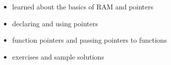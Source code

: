 \documentclass[11pt]{article}
\makeatletter
\providecommand{\tightlist}{%
      \setlength{\itemsep}{0pt}\setlength{\parskip}{0pt}}
\newcommand{\boxspacing}{\kern\kvtcb@left@rule\kern\kvtcb@boxsep}
\newcommand{\prompt}[4]{
        {\ttfamily\llap{{\color{#2}[#3]:\hspace{3pt}#4}}\vspace{-\baselineskip}}
    }
\makeatother
\begin{document}
\begin{itemize}
\tightlist
\item
  learned about the basics of RAM and pointers
\item
  declaring and using pointers
\item
  function pointers and passing pointers to functions
\item
  exercises and sample solutions
\end{itemize}

    \begin{tcolorbox}[breakable, size=fbox, boxrule=1pt, pad at break*=1mm,colback=cellbackground, colframe=cellborder]
\prompt{In}{incolor}{ }{\boxspacing}
\begin{Verbatim}[commandchars=\\\{\}]

\end{Verbatim}
\end{tcolorbox}


    
    
    
\end{document}
